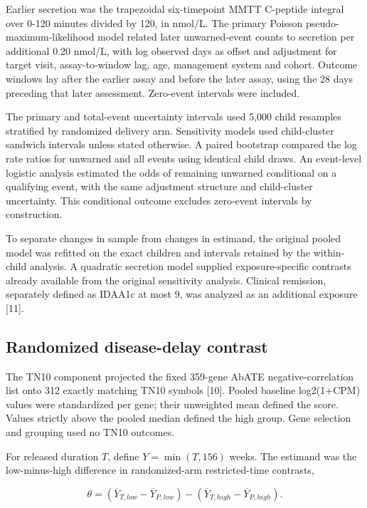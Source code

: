 \documentclass[
  american,
  11pt,
  letterpaper,
]{article}
\begin{document}
Earlier secretion was the trapezoidal six-timepoint MMTT C-peptide
integral over 0-120 minutes divided by 120, in nmol/L. The primary
Poisson pseudo-maximum-likelihood model related later unwarned-event
counts to secretion per additional 0.20 nmol/L, with log observed days
as offset and adjustment for target visit, assay-to-window lag, age,
management system and cohort. Outcome windows lay after the earlier
assay and before the later assay, using the 28 days preceding that later
assessment. Zero-event intervals were included.

The primary and total-event uncertainty intervals used 5,000 child
resamples stratified by randomized delivery arm. Sensitivity models used
child-cluster sandwich intervals unless stated otherwise. A paired
bootstrap compared the log rate ratios for unwarned and all events using
identical child draws. An event-level logistic analysis estimated the
odds of remaining unwarned conditional on a qualifying event, with the
same adjustment structure and child-cluster uncertainty. This
conditional outcome excludes zero-event intervals by construction.

To separate changes in sample from changes in estimand, the original
pooled model was refitted on the exact children and intervals retained
by the within-child analysis. A quadratic secretion model supplied
exposure-specific contrasts already available from the original
sensitivity analysis. Clinical remission, separately defined as IDAA1c
at most 9, was analyzed as an additional exposure {[}11{]}.

\subsection{Randomized disease-delay
contrast}\label{randomized-disease-delay-contrast}

The TN10 component projected the fixed 359-gene AbATE
negative-correlation list onto 312 exactly matching TN10 symbols
{[}10{]}. Pooled baseline log2(1+CPM) values were standardized per gene;
their unweighted mean defined the score. Values strictly above the
pooled median defined the high group. Gene selection and grouping used
no TN10 outcomes.

For released duration \(T\), define \(Y=\min(T,156)\) weeks. The
estimand was the low-minus-high difference in randomized-arm
restricted-time contrasts,

\[
\theta=(\overline{Y}_{T,low}-\overline{Y}_{P,low})-(\overline{Y}_{T,high}-\overline{Y}_{P,high}).
\]
\end{document}
